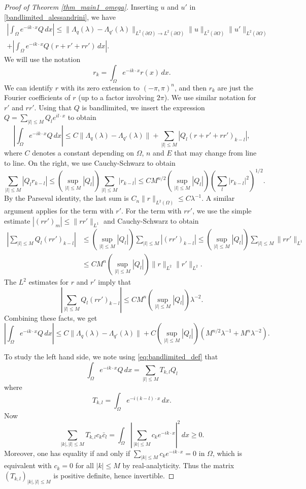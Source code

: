 \documentclass[a4paper, 11pt, twoside, notitlepage]{amsart}
\theoremstyle{definition}
\theoremstyle{remark}
\newcommand{\f}[1]{\footnote{\textcolor{blue}{#1}}}
\newcommand{\norm}[1]{\lVert #1 \rVert}
\begin{document}
\begin{proof}[Proof of Theorem \ref{thm_main1_omega}]
Inserting $u$ and $u'$ in \eqref{bandlimited_alessandrini}, we have 
\begin{multline*}
\left| \int_{\Omega} e^{-ik \cdot x} Q \,dx \right| \leq \|\Lambda_q(\lambda)-\Lambda_{q'}(\lambda)\|_{L^2(\partial \Omega)\rightarrow L^2(\partial \Omega)} \|u\|_{L^2(\partial \Omega)}\|u'\|_{L^2(\partial \Omega)} \\
 + \left| \int_{\Omega} e^{-ik \cdot x} Q (r + r' + r r') \,dx \right|.
\end{multline*}
We will use the notation 
\[
r_k = \int_{\Omega} e^{-ik \cdot x} r(x) \,dx.
\]
We can identify $r$ with its zero extension to $(-\pi, \pi)^n$, and then $r_k$ are just the Fourier coefficients of $r$ (up to a factor involving $2\pi$). We use similar notation for $r'$ and $r r'$. Using that $Q$ is bandlimited, we insert the expression $Q = \sum_{|l| \leq M} Q_l e^{il \cdot x}$ to obtain 
\[
\left| \int_{\Omega} e^{-ik \cdot x} Q \,dx \right|  \leq C \|\Lambda_q(\lambda)-\Lambda_{q'}(\lambda)\| + \sum_{|l| \leq M} |Q_l (r+r'+r r')_{k-l}|,
\]
where $C$ denotes a constant depending on $\Omega$, $n$ and $E$ that may change from line to line. On the right, we use Cauchy-Schwarz to obtain 
\[
\sum_{|l| \leq M} |Q_l r_{k-l}| \leq (\sup_{|l| \leq M} |Q_l|) \sum_{|l| \leq M} |r_{k-l}| \leq C M^{n/2} (\sup_{|l| \leq M} |Q_l|) (\sum_l |r_{k-l}|^2)^{1/2}.
\]
By the Parseval identity, the last sum is $C_n \norm{r}_{L^2(\Omega)} \leq C \lambda^{-1}$.%
A similar argument applies for the term with $r'$. For the term with $r r'$, we use the simple estimate $|(r r')_m| \leq \norm{r r'}_{L^1}$ and Cauchy-Schwarz to obtain  
\begin{align*}
| \sum_{|l| \leq M} Q_l (r r')_{k-l} | &\leq (\sup_{|l| \leq M} |Q_l|) \sum_{|l| \leq M} |(r r')_{k-l}| \leq (\sup_{|l| \leq M} |Q_l|) \sum_{|l| \leq M} \norm{r r'}_{L^1} \\
 &\leq C M^n (\sup_{|l| \leq M} |Q_l|) \norm{r}_{L^2} \norm{r'}_{L^2}.
\end{align*}
The $L^2$ estimates for $r$ and $r'$ imply that 
\[
| \sum_{|l| \leq M} Q_l (r r')_{k-l} | \leq C M^n (\sup_{|l| \leq M} |Q_l|) \lambda^{-2}.
\]
Combining these facts, we get 
\[
\left| \int_{\Omega} e^{-ik \cdot x} Q \,dx \right|  \leq C \|\Lambda_q(\lambda)-\Lambda_{q'}(\lambda)\| + C (\sup_{|l| \leq M} |Q_l|) (M^{n/2} \lambda^{-1} + M^n \lambda^{-2}).
\]

To study the left hand side, we note using \eqref{eq:bandlimited_def} that 
\[
\int_{\Omega} e^{-ik \cdot x} Q \,dx = \sum_{|l| \leq M} T_{k,l} Q_l
\]
where 
\[
T_{k,l} = \int_{\Omega} e^{-i(k-l) \cdot x} \,dx.
\]
Now 
\[
\sum_{|k|, |l| \leq M} T_{k,l} c_k \bar{c}_l = \int_{\Omega} \left| \sum_{|k| \leq M} c_k e^{-ik \cdot x} \right|^2 \,dx \geq 0.
\]
Moreover, one has equality if and only if $\sum_{|k| \leq M} c_k e^{-ik \cdot x} = 0$ in $\Omega$, which is equivalent with $c_k=0$ for all $|k| \leq M$ by real-analyticity. Thus the matrix $(T_{k,l})_{|k|, |l| \leq M}$ is positive definite, hence invertible.


\end{proof}
\end{document}

